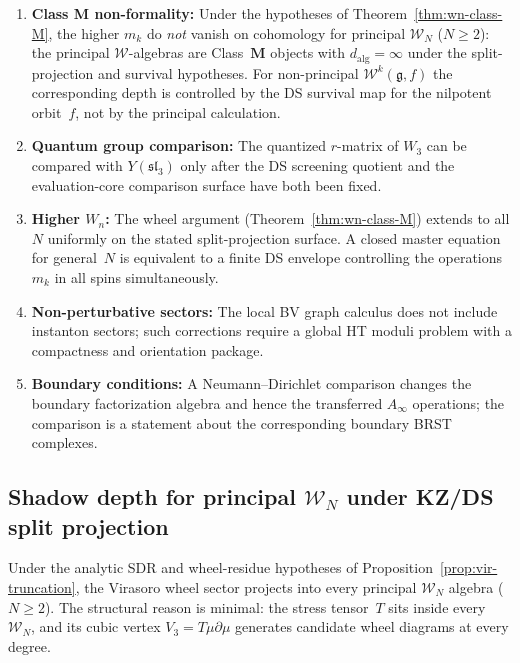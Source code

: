 \begin{enumerate}
\item \textbf{Class M non-formality:} Under the hypotheses of
 Theorem~\ref{thm:wn-class-M}, the higher $m_k$ do \emph{not}
 vanish on cohomology for principal $\mathcal{W}_N$ ($N \ge 2$):
 the principal $\mathcal{W}$-algebras are
 Class~$\mathbf{M}$ objects with $d_{\mathrm{alg}} = \infty$
 under the split-projection and survival hypotheses.
 For non-principal $\mathcal{W}^k(\mathfrak{g}, f)$ the corresponding
 depth is controlled by the DS survival map for the nilpotent orbit~$f$,
 not by the principal calculation.

\item \textbf{Quantum group comparison:} The quantized $r$-matrix of
$W_3$ can be compared with $Y(\mathfrak{sl}_3)$ only after the DS
screening quotient and the evaluation-core comparison surface have
both been fixed.

\item \textbf{Higher $W_n$:} The wheel argument
 (Theorem~\ref{thm:wn-class-M}) extends to all $N$
 uniformly on the stated split-projection surface. A closed master
 equation for general~$N$ is equivalent to a finite DS envelope
 controlling the operations $m_k$ in all spins simultaneously.

\item \textbf{Non-perturbative sectors:} The local BV graph calculus
does not include instanton sectors; such corrections require a global
HT moduli problem with a compactness and orientation package.

\item \textbf{Boundary conditions:} A Neumann--Dirichlet comparison
changes the boundary factorization algebra and hence the transferred
$A_\infty$ operations; the comparison is a statement about the
corresponding boundary BRST complexes.
\end{enumerate}


\subsection{Shadow depth for principal
\texorpdfstring{$\mathcal{W}_N$}{W\_N} under KZ/DS split projection}
\label{subsec:wn-class-M}

Under the analytic SDR and wheel-residue hypotheses of
Proposition~\ref{prop:vir-truncation}, the Virasoro wheel sector
projects into every principal $\mathcal{W}_N$ algebra ($N \ge 2$).
The structural reason is minimal: the stress tensor~$T$ sits inside
every $\mathcal{W}_N$, and its cubic vertex
$V_3 = T\mu\partial\mu$ generates candidate wheel diagrams at every
degree.

